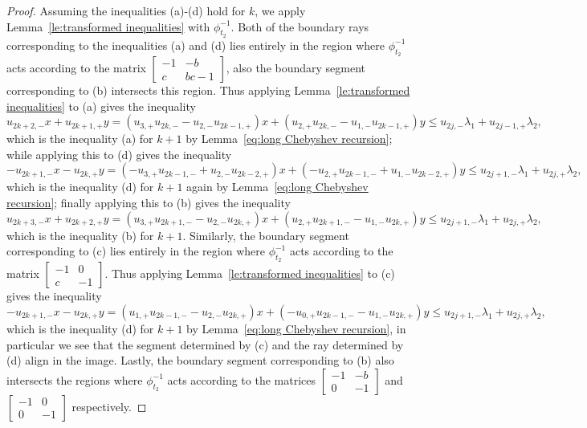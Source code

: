 \documentclass{amsart}
\numberwithin{theorem}{section}
\begin{document}
\begin{proof}
    Assuming the inequalities (a)-(d) hold for $k$, we apply Lemma~\ref{le:transformed inequalities} with $\phi_{t_2}^{-1}$.
    Both of the boundary rays corresponding to the inequalities (a) and (d) lies entirely in the region where $\phi_{t_2}^{-1}$ acts according to the matrix $\left[ \begin{array}{cc} -1 & -b\\ c & bc-1 \end{array}\right]$, also the boundary segment corresponding to (b) intersects this region.
    Thus applying Lemma~\ref{le:transformed inequalities} to (a) gives the inequality 
    \[u_{2k+2,-}x+u_{2k+1,+}y=(u_{3,+}u_{2k,-}-u_{2,-}u_{2k-1,+})x+(u_{2,+}u_{2k,-}-u_{1,-}u_{2k-1,+})y\le u_{2j,-}\lambda_1+u_{2j-1,+}\lambda_2,\]
    which is the inequality (a) for $k+1$ by Lemma~\ref{eq:long Chebyshev recursion}; while applying this to (d) gives the inequality 
    \[-u_{2k+1,-}x-u_{2k,+}y=(-u_{3,+}u_{2k-1,-}+u_{2,-}u_{2k-2,+})x+(-u_{2,+}u_{2k-1,-}+u_{1,-}u_{2k-2,+})y\le u_{2j+1,-}\lambda_1+u_{2j,+}\lambda_2,\]
    which is the inequality (d) for $k+1$ again by Lemma~\ref{eq:long Chebyshev recursion}; finally applying this to (b) gives the inequality 
    \[u_{2k+3,-}x+u_{2k+2,+}y=(u_{3,+}u_{2k+1,-}-u_{2,-}u_{2k,+})x+(u_{2,+}u_{2k+1,-}-u_{1,-}u_{2k,+})y\le u_{2j+1,-}\lambda_1+u_{2j,+}\lambda_2,\]
    which is the inequality (b) for $k+1$.
    Similarly, the boundary segment corresponding to (c) lies entirely in the region where $\phi_{t_2}^{-1}$ acts according to the matrix $\left[ \begin{array}{cc} -1 & 0\\ c & -1 \end{array}\right]$.
    Thus applying Lemma~\ref{le:transformed inequalities} to (c) gives the inequality 
    \[-u_{2k+1,-}x-u_{2k,+}y=(u_{1,+}u_{2k-1,-}-u_{2,-}u_{2k,+})x+(-u_{0,+}u_{2k-1,-}-u_{1,-}u_{2k,+})y\le u_{2j+1,-}\lambda_1+u_{2j,+}\lambda_2,\]
    which is the inequality (d) for $k+1$ by Lemma~\ref{eq:long Chebyshev recursion}, in particular we see that the segment determined by (c) and the ray determined by (d) align in the image.
    Lastly, the boundary segment corresponding to (b) also intersects the regions where $\phi_{t_2}^{-1}$ acts according to the matrices $\left[ \begin{array}{cc} -1 & -b\\ 0 & -1 \end{array}\right]$ and $\left[ \begin{array}{cc} -1 & 0\\ 0 & -1 \end{array}\right]$ respectively.

\end{proof}
\end{document}
